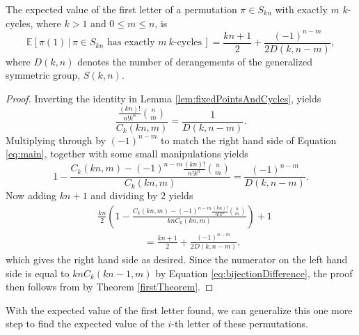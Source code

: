 \begin{theorem}
  \label{secondTheorem}
  The expected value of the first letter of a permutation
  $\pi \in S_{kn}$ with exactly $m$ $k$-cycles, where $k > 1$ and $0 \leq m \leq n$, is
  \begin{equation}
    \label{eq:main}
    \mathbb{E}[\pi(1)\, |\, \pi \in S_{kn} \text{ has exactly } m\ k \text{-cycles}\,] =
    \frac{kn + 1}{2} + \frac{(-1)^{n-m}}{2 D(k, n - m)},
  \end{equation}
  where $D(k, n)$ denotes the number of derangements of the generalized symmetric
  group, $S(k, n)$.
\end{theorem}
\begin{proof}
  Inverting the identity in Lemma \ref{lem:fixedPointsAndCycles}, yields \begin{equation}
    \frac{\frac{(kn)!}{n!k^n}\binom n m}{C_k(kn, m)}
    = \frac{1}{D(k, n - m)}.
  \end{equation}
  Multiplying through by $(-1)^{n - m}$ to match the right hand side of Equation
  \ref{eq:main}, together with some small manipulations yields \begin{equation}
    1 - \frac{C_k(kn, m) - (-1)^{n - m}\frac{(kn)!}{n!k^n}\binom n m}{C_k(kn, m)}
    = \frac{(-1)^{n-m}}{D(k, n - m)}.
  \end{equation}
  Now adding $kn + 1$ and dividing by $2$ yields \begin{align}
    &\frac{kn}{2}\left(1 - \frac{C_k(kn, m) - (-1)^{n - m}\frac{(kn)!}{n!k^n}\binom n m}{knC_k(kn, m)}\right) + 1
    \nonumber
    \\
    & \hspace{2cm} = \frac{kn+1}{2} + \frac{(-1)^{n-m}}{2 D(k, n - m)},
  \end{align}
  which gives the right hand side as desired.
  Since the numerator on the left hand
  side is equal to ${kn C_k(kn - 1, m)}$ by Equation \ref{eq:bijectionDifference},
  the proof then follows from by Theorem \ref{firstTheorem}.
\end{proof}

With the expected value of the first letter found,
we can generalize this one more step to find the expected value of the
$i$-th letter of these permutations.

